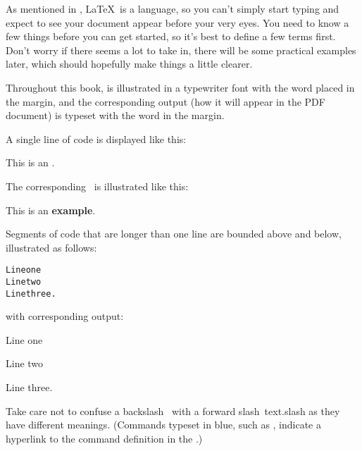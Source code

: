 \label{ch:def}%

As mentioned in , \LaTeX\ is a
language, so you can't simply start typing and expect to see your
document appear before your very eyes.  You need to know a few things
before you can get started, so it's best to define a few terms first.
Don't worry if there seems a lot to take in, there will be some
practical examples later, which should hopefully make things a little
clearer.

\begin{latexonly}
Throughout this book,  is
illustrated in a typewriter font with the word
 placed in the margin, and the corresponding
output (how it will appear in the PDF document) is typeset with the word  in the
margin.  

A single line of code is displayed like this:
\end{latexonly}
\begin{codeS}
This is an .
\end{codeS}%
The corresponding 
\ is illustrated like this:
\begin{resultS}
This is an \textbf{example}.
\end{resultS}%
\begin{latexonly}%
Segments of code that are longer than one line are bounded above and below, illustrated as follows:
\begin{code}
\begin{alltt}
Line one
Line two
Line three.
\end{alltt}
\end{code}%
with corresponding output:
\begin{result}
Line one\par
Line two\par
Line three.
\end{result}%
\end{latexonly}%
Take care not to confuse a backslash~
with a forward slash~\gls{text.slash} as they have different meanings.
\doifnotbook
{%
  (Commands typeset in blue, such as , indicate a hyperlink to
  the command definition in the .)
}

